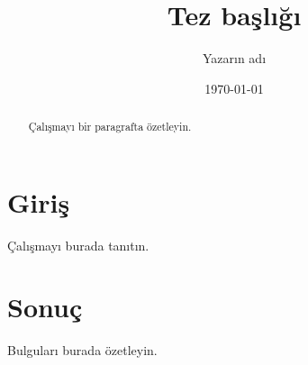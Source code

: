 \documentclass[12pt]{report}
\title{Tez başlığı}
\author{Yazarın adı}
\date{\today}
\begin{document}
\maketitle

\begin{abstract}
Çalışmayı bir paragrafta özetleyin.
\end{abstract}

\tableofcontents

\chapter{Giriş}
Çalışmayı burada tanıtın.

\chapter{Sonuç}
Bulguları burada özetleyin.
\end{document}
